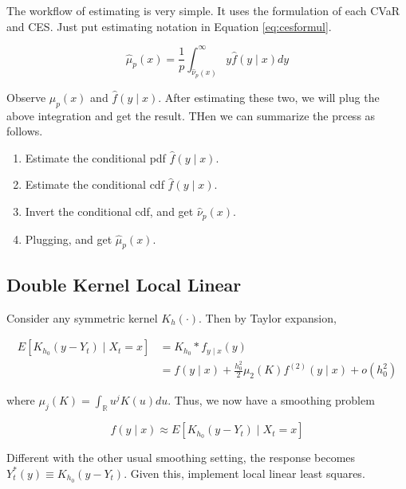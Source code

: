 \documentclass[
]{article}
\providecommand{\tightlist}{%
  \setlength{\itemsep}{0pt}\setlength{\parskip}{0pt}}
\theoremstyle{definition}
\theoremstyle{definition}
\theoremstyle{definition}
\theoremstyle{remark}
\begin{document}
The workflow of estimating is very simple. It uses the formulation of each CVaR and CES. Just put estimating notation in Equation \eqref{eq:cesformul}.

\begin{equation}
  \hat\mu_p(x) = \frac{1}{p} \int_{\hat\nu_p(x)}^\infty y \hat{f}(y \mid x) dy
  \label{eq:ceshat}
\end{equation}

Observe \(\hat\mu_p(x)\) and \(\hat{f}(y \mid x)\). After estimating these two, we will plug the above integration and get the result. THen we can summarize the prcess as follows.

\begin{enumerate}
\def\labelenumi{\arabic{enumi}.}
\tightlist
\item
  Estimate the conditional pdf \(\hat{f}(y \mid x)\).
\item
  Estimate the conditional cdf \(\hat{f}(y \mid x)\).
\item
  Invert the conditional cdf, and get \(\hat\nu_p(x)\).
\item
  Plugging, and get \(\hat\mu_p(x)\).
\end{enumerate}

\hypertarget{double-kernel-local-linear}{%
\subsection{Double Kernel Local Linear}\label{double-kernel-local-linear}}

Consider any symmetric kernel \(K_h(\cdot)\). Then by Taylor expansion,

\begin{equation}
  \begin{split}
    E [ K_{h_0}(y - Y_t) \mid X_t = x ] & = K_{h_0} \ast f_{y \mid x} (y) \\
    & = f(y \mid x) + \frac{h_0^2}{2} \mu_2(K) f^{(2)}(y \mid x) + o(h_0^2)
  \end{split}
  \label{eq:convolution}
\end{equation}

where \(\mu_j(K) = \int_{\mathbb{R}}u^j K(u) du\). Thus, we now have a smoothing problem

\begin{equation}
  f(y \mid x) \approx E \left[ K_{h_0}(y - Y_t) \mid X_t = x \right]
  \label{eq:smoothing}
\end{equation}

Different with the other usual smoothing setting, the response becomes \(Y_t^{\ast}(y) \equiv K_{h_0}(y - Y_t)\). Given this, implement local linear least squares.
\end{document}
